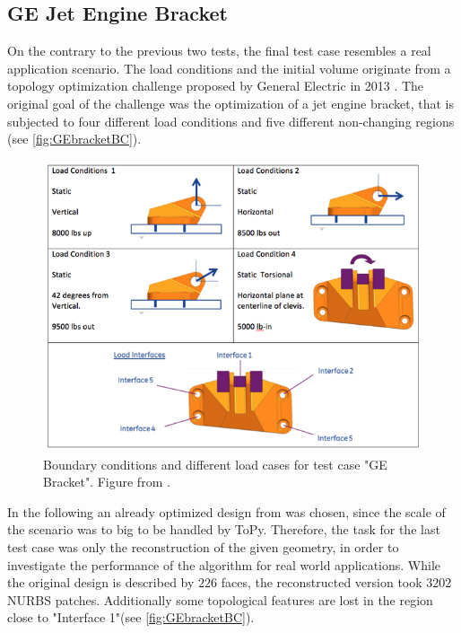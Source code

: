 \subsection{GE Jet Engine Bracket}
\label{ssec:bracket}
On the contrary to the previous two tests, the final test case resembles a real application scenario. The load conditions and the initial volume originate from a topology optimization challenge proposed by General Electric in 2013 \cite{GEBracket}. The original goal of the challenge was the optimization of a jet engine bracket, that is subjected to four different load conditions and five different non-changing regions (see \autoref{fig:GEbracketBC}).
\begin{figure}[H]
\begin{center}
\includegraphics[scale = 0.4]{Pictures/GEbracket.png}
\end{center}
\caption{Boundary conditions and different load cases for test case "GE Bracket". Figure from \cite{GEBracket}.}
\label{fig:GEbracketBC}
\end{figure}
In the following an already optimized design from \cite{GEBracketTripon} was chosen, since the scale of the scenario was to big to be handled by ToPy. Therefore, the task for the last test case was only the reconstruction of the given geometry, in order to investigate the performance of the algorithm for real world applications. While the original design is described by $226$ faces, the reconstructed version took $3202$ NURBS patches. Additionally some topological features are lost in the region close to "Interface 1"(see \autoref{fig:GEbracketBC}).
\enlargethispage{2cm}
